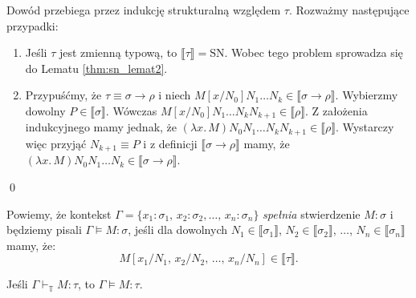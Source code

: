 \begin{dowod}
  Dowód przebiega przez indukcję strukturalną względem \(\tau\). Rozważmy następujące przypadki:
  \begin{enumerate}[label=(\alph*)]
    \setlength\itemsep{0em}
    \item Jeśli \(\tau\) jest zmienną typową, to \(\llbracket \tau \rrbracket=\mathrm{SN}\). Wobec tego problem sprowadza się do Lematu \ref{thm:sn_lemat2}.  
    \item Przypuśćmy, że \(\tau\equiv \sigma\to\rho\) i niech \(M[x/N_0]N_1\dots N_k \in \llbracket \sigma\to \rho \rrbracket\). Wybierzmy dowolny \(P\in\llbracket\sigma\rrbracket\). Wówczas \(M[x/N_0] N_1 \dots N_k N_{k+1}\in\llbracket \rho\rrbracket\). Z założenia indukcyjnego mamy jednak, że 
      \(
        (\lambda x.\,M)N_0 N_1\dots N_k N_{k+1}\in\llbracket \rho \rrbracket.
      \)
      Wystarczy więc przyjąć \(N_{k+1}\equiv P\) i z definicji \(\llbracket \sigma \to \rho \rrbracket\) mamy, że \((\lambda x.\,M)N_0 N_1 \dots N_k \in \llbracket \sigma \to \rho \rrbracket\).
  \end{enumerate}
  \qed
\end{dowod}
\begin{definicja}
  Powiemy, że kontekst \(\Gamma=\{x_1:\sigma_1,\,x_2:\sigma_2,\dots ,\,x_n:\sigma_n\}\) \emph{spełnia} stwierdzenie \(M:\sigma\) i będziemy pisali \(\Gamma\models M:\sigma\), jeśli dla dowolnych \(N_1\in\llbracket \sigma_1 \rrbracket\), \(N_2\in\llbracket \sigma_2 \rrbracket\), \(\dots\), \(N_n\in\llbracket \sigma_n \rrbracket\) mamy, że:
  \[
    M[x_1/N_1,\,x_2/N_2,\,\dots,\,x_n/N_n]\in\llbracket \tau \rrbracket.
  \]
\end{definicja}
\begin{lemat}\label{thm:o_poprawnosci}
  Jeśli \(\Gamma\vdash_{\mathbb{T}}M:\tau\), to \(\Gamma\models M:\tau\).
\end{lemat}
